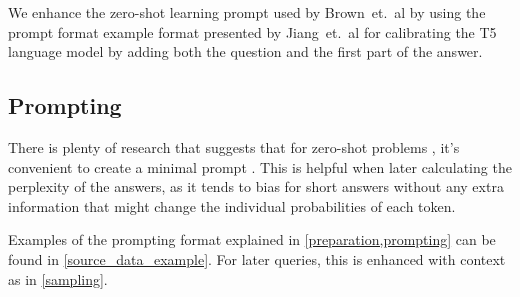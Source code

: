 We enhance the zero-shot learning prompt used by Brown~et.~al \citep{fewshotlearners} by using the prompt format example format presented by Jiang~et.~al \citep{how_can_we_know} for calibrating the T5 language model by adding both the question and the first part of the answer.

\subsection{Prompting}
\label{prompting}

There is plenty of research that suggests that for zero-shot problems \citep{fewshotlearners,beyondfewshot}, it's convenient to create a minimal prompt \citep{how_can_we_know,factual_recall}.
This is helpful when later calculating the perplexity of the answers, as it tends to bias for short answers without any extra information that might change the individual probabilities of each token.

Examples of the prompting format explained in \cref{preparation,prompting} can be found in \cref{source_data_example}.
For later queries, this is enhanced with context as in \cref{sampling}.

